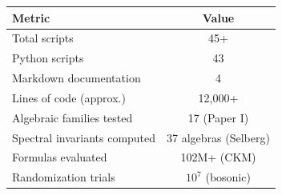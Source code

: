 \begin{center}
\small
{}
\begin{tabular}{lc}
\hline\hline
Metric & Value \\
\hline
Total scripts & 45+ \\
Python scripts & 43 \\
Markdown documentation & 4 \\
Lines of code (approx.) & 12,000+ \\
Algebraic families tested & 17 (Paper I) \\
Spectral invariants computed & 37 algebras (Selberg) \\
Formulas evaluated & 102M+ (CKM) \\
Randomization trials & $10^7$ (bosonic) \\
\hline\hline
\end{tabular}
\end{center}
